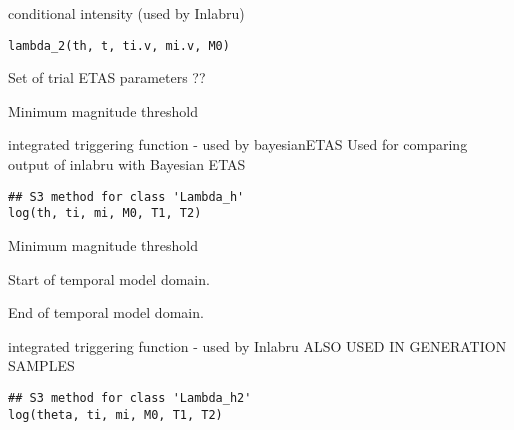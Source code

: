 \documentclass[letterpaper]{book}
\begin{document}
%
\begin{Description}\relax
conditional intensity (used by Inlabru)
\end{Description}
%
\begin{Usage}
\begin{verbatim}
lambda_2(th, t, ti.v, mi.v, M0)
\end{verbatim}
\end{Usage}
%
\begin{Arguments}
\begin{ldescription}
\item[\code{th}] Set of trial ETAS parameters ??

\item[\code{M0}] Minimum magnitude threshold
\end{ldescription}
\end{Arguments}
%
\begin{Description}\relax
integrated triggering function - used by bayesianETAS
Used for comparing output of inlabru with Bayesian ETAS
\end{Description}
%
\begin{Usage}
\begin{verbatim}
## S3 method for class 'Lambda_h'
log(th, ti, mi, M0, T1, T2)
\end{verbatim}
\end{Usage}
%
\begin{Arguments}
\begin{ldescription}
\item[\code{M0}] Minimum magnitude threshold

\item[\code{T1}] Start of temporal model domain.

\item[\code{T2}] End of temporal model domain.
\end{ldescription}
\end{Arguments}
%
\begin{Description}\relax
integrated triggering function - used by Inlabru ALSO USED IN GENERATION SAMPLES
\end{Description}
%
\begin{Usage}
\begin{verbatim}
## S3 method for class 'Lambda_h2'
log(theta, ti, mi, M0, T1, T2)
\end{verbatim}
\end{Usage}
\end{document}
